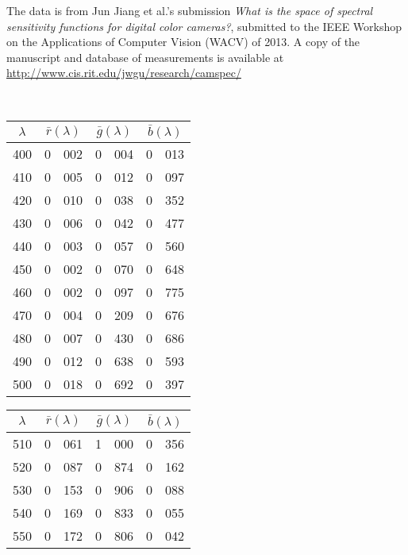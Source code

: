 The data is from Jun Jiang et al.'s submission \textit{What is the space of spectral sensitivity
functions for digital color cameras?}, submitted to the IEEE Workshop on the Applications of Computer
Vision (WACV) of 2013.
A copy of the manuscript and database of measurements is available at 
\url{http://www.cis.rit.edu/jwgu/research/camspec/}

{
\small
{
\noindent\resizebox{\linewidth}{!}{}\\
\setlength{\tabcolsep}{.35em}
\begin{minipage}{.3\textwidth}
\centering
\begin{tabular}{c|r@{.}l | r@{.}l | r@{.}l}
$\lambda$ & \multicolumn{2}{c|}{$\bar r(\lambda)$} &  \multicolumn{2}{c|}{$\bar g(\lambda)$} &  \multicolumn{2}{c}{$\bar b(\lambda)$} \\
\hline
 400 &   0&002 &   0&004 &   0&013 \\
 410 &   0&005 &   0&012 &   0&097 \\
 420 &   0&010 &   0&038 &   0&352 \\
 430 &   0&006 &   0&042 &   0&477 \\
 440 &   0&003 &   0&057 &   0&560 \\
 450 &   0&002 &   0&070 &   0&648 \\
 460 &   0&002 &   0&097 &   0&775 \\
 470 &   0&004 &   0&209 &   0&676 \\
 480 &   0&007 &   0&430 &   0&686 \\
 490 &   0&012 &   0&638 &   0&593 \\
 500 &   0&018 &   0&692 &   0&397 \\
\end{tabular}
\end{minipage}\hfill
\begin{minipage}{.3\textwidth}
\centering
\begin{tabular}{c|r@{.}l | r@{.}l | r@{.}l}
$\lambda$ & \multicolumn{2}{c|}{$\bar r(\lambda)$} &  \multicolumn{2}{c|}{$\bar g(\lambda)$} &  \multicolumn{2}{c}{$\bar b(\lambda)$} \\
\hline
 510 &   0&061 &   1&000 &   0&356 \\
 520 &   0&087 &   0&874 &   0&162 \\
 530 &   0&153 &   0&906 &   0&088 \\
 540 &   0&169 &   0&833 &   0&055 \\
 550 &   0&172 &   0&806 &   0&042 \\

\end{tabular}
\end{minipage}}}
